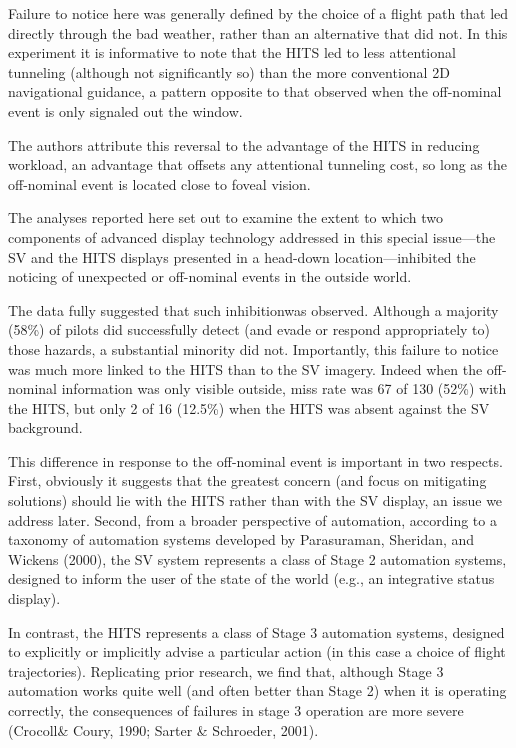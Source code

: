 \documentclass[utf8,bachelor,manualbib]{gradu3}
\begin{document}
Failure to notice here was generally defined by the choice of a flight path that led directly through the bad weather, rather than an alternative that did not. In this experiment it is informative to note that the HITS led to less attentional tunneling (although not significantly so) than the more conventional 2D navigational guidance, a pattern opposite to that observed when the off-nominal event is only signaled out the window.

The authors attribute this reversal to the advantage of the HITS in reducing workload, an advantage that offsets any attentional tunneling cost, so long as the off-nominal event is located close to foveal vision.

The analyses reported here set out to examine the extent to which two components of advanced display technology addressed in this special issue—the SV and the HITS displays presented in a head-down location—inhibited the noticing of unexpected or off-nominal events in the outside world.

The data fully suggested that such inhibitionwas observed. Although a majority (58\%) of pilots did successfully detect (and evade or respond appropriately to) those hazards, a substantial minority did not. Importantly, this failure to notice was much more linked to the HITS than to the SV imagery. Indeed when the off-nominal information was only visible outside, miss rate was 67 of 130 (52\%) with the HITS, but only 2 of 16 (12.5\%) when the HITS was absent against the SV background.






This difference in response to the off-nominal event is important in two respects. First, obviously it suggests that the greatest concern (and focus on mitigating solutions) should lie with the HITS rather than with the SV display, an issue we address later. Second, from a broader perspective of automation, according to a taxonomy of automation systems developed by Parasuraman, Sheridan, and Wickens (2000), the SV system represents a class of Stage 2 automation systems, designed to inform the user of the state of the world (e.g., an integrative status display).

In contrast, the HITS represents a class of Stage 3 automation systems, designed
to explicitly or implicitly advise a particular action (in this case a choice of
flight trajectories). Replicating prior research, we find that, although Stage 3 automation works quite well (and often better than Stage 2) when it is operating correctly, the consequences of failures in stage 3 operation are more severe (Crocoll\&
Coury, 1990; Sarter \& Schroeder, 2001).
\end{document}

